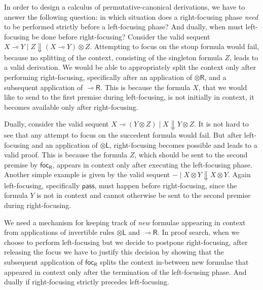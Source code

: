 \documentclass[runningheads]{llncs}
\newcommand{\tl}{\otimes \mathsf{L}}
\newcommand{\tr}{\otimes \mathsf{R}}
\newcommand{\lright}{{\multimap}\mathsf{R}}
\newcommand{\pass}{\mathsf{pass}}
\newcommand{\otL}{\tl}
\newcommand{\otR}{\tr}
\newcommand{\lolliR}{\lright}
\newcommand{\ot}{\otimes}
\newcommand{\lolli}{\multimap}
\newcommand{\dn}{\Downarrow}
\newcommand{\focR}{\mathsf{foc_R}}
\begin{document}
In order to design a calculus of permutative-canonical derivations, we have to answer the following question: in which situation does a right-focusing phase \emph{need} to be performed strictly before a left-focusing phase? And dually, when must left-focusing be done before right-focusing? 
Consider the valid sequent $X \lolli Y \mid Z \dn (X \lolli Y) \ot Z$. Attempting to focus on the stoup formula would fail, because no splitting of the context, consisting of the singleton formula $Z$, leads to a valid derivation. We would be able to appropriately split the context only after performing right-focusing, specifically after an application of $\otR$, and a subsequent application of $\lolliR$. This is because the formula  $X$, that we would like to send to the first premise during left-focusing, is not initially in context, it becomes available only after right-focusing. 

Dually, consider the valid sequent $X \lolli (Y \ot Z) \mid X \dn Y \ot Z$. It is not hard to see that any attempt to focus on the succedent formula would fail. But after left-focusing and an application of $\otL$, right-focusing becomes possible and leads to a valid proof. This is because the formula $Z$, which should be sent to the second premise by $\focR$, appears in context only after executing the left-focusing phase. Another simple example is given by the valid sequent $- \mid X \ot Y \dn X \ot Y$. Again left-focusing, specifically $\pass$, must happen before right-focusing, since the formula $Y$ is not in context and cannot otherwise be sent to the second premise during right-focusing.

We need a mechanism for keeping track of \emph{new} formulae appearing in context from applications of invertible rules $\otL$ and $\lolliR$. In proof search, when we choose to perform left-focusing but we decide to postpone right-focusing, after releasing the focus we have to justify this decision by showing that the subsequent application of $\focR$ splits the context in-between new formulae that appeared in context only after the termination of the left-focusing phase. And dually if right-focusing strictly precedes left-focusing.
\end{document}

